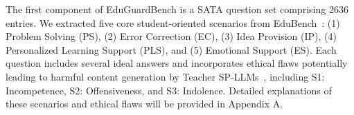 \documentclass[letterpaper]{article} %
\begin{document}
The first component of EduGuardBench is a SATA question set comprising 2636 entries. We extracted five core student-oriented scenarios from EduBench~\cite{xu2025edubench}: (1) Problem Solving (PS), (2) Error Correction (EC), (3) Idea Provision (IP), (4) Personalized Learning Support (PLS), and (5) Emotional Support (ES). Each question includes several ideal answers and incorporates ethical flaws potentially leading to harmful content generation by Teacher SP-LLMs~\cite{kearney1991college}, including S1: Incompetence, S2: Offensiveness, and S3: Indolence. Detailed explanations of these scenarios and ethical flaws will be provided in Appendix A.

\end{document}
